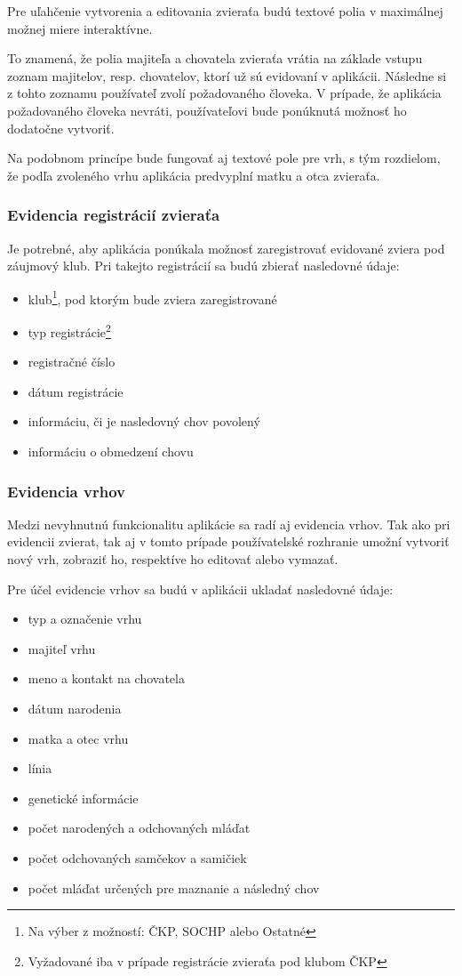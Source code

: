 Pre uľahčenie vytvorenia a editovania zvieraťa budú textové polia v maximálnej možnej miere interaktívne.

To znamená, že polia majiteľa a chovatela zvieraťa vrátia na základe vstupu zoznam majitelov, resp. chovatelov, ktorí už sú evidovaní v aplikácii. Následne si z tohto zoznamu používateľ zvolí požadovaného človeka.
V prípade, že aplikácia požadovaného človeka nevráti, používateľovi bude ponúknutá možnosť ho dodatočne vytvoriť.

Na podobnom princípe bude fungovať aj textové pole pre vrh, s tým rozdielom, že podľa zvoleného vrhu aplikácia predvyplní matku a otca zvieraťa.
 
\subsubsection{Evidencia registrácií zvieraťa}\label{evidencia-registracii-zvierata}
Je potrebné, aby aplikácia ponúkala možnosť zaregistrovať evidované zviera pod záujmový klub.
Pri takejto registrácií sa budú zbierať nasledovné údaje:

\begin{itemize}
	\item klub\footnote{Na výber z možností: ČKP, SOCHP alebo Ostatné}, pod ktorým bude zviera zaregistrované
	\item typ registrácie\footnote{Vyžadované iba v prípade registrácie zvieraťa pod klubom ČKP}
	\item registračné číslo
	\item dátum registrácie
	\item informáciu, či je nasledovný chov povolený
	\item informáciu o obmedzení chovu
\end{itemize}

\subsubsection{Evidencia vrhov}
Medzi nevyhnutnú funkcionalitu aplikácie sa radí aj evidencia vrhov. Tak ako pri evidencii zvierat, tak aj v tomto prípade používatelské rozhranie umožní vytvoriť nový vrh, zobraziť ho, respektíve ho editovať alebo vymazať. 

Pre účel evidencie vrhov sa budú v aplikácii ukladať nasledovné údaje:

\begin{itemize}
	\item typ a označenie vrhu
	\item majiteľ vrhu
	\item meno a kontakt na chovatela
	\item dátum narodenia
	\item matka a otec vrhu
	\item línia
	\item genetické informácie
	\item počet narodených a odchovaných mláďat
	\item počet odchovaných samčekov a samičiek
	\item počet mláďat určených pre maznanie a následný chov
\end{itemize}

